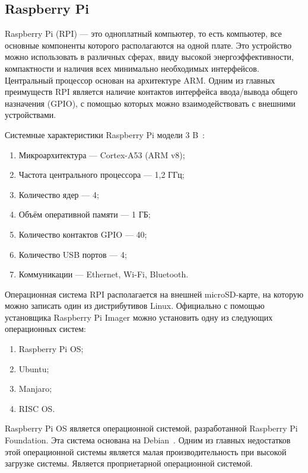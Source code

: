 \subsection{Raspberry Pi}

Raspberry Pi (RPI) --- это одноплатный компьютер, то есть компьютер, все основные компоненты которого располагаются на одной плате. Это устройство можно использовать в различных сферах, ввиду высокой энергоэффективности, компактности и наличия всех минимально необходимых интерфейсов. Центральный процессор основан на архитектуре ARM. Одним из главных преимуществ RPI является наличие контактов интерфейса ввода/вывода общего назначения (GPIO), с помощью которых можно взаимодействовать с внешними устройствами.

Системные характеристики Raspberry Pi модели 3 B~\cite{rpi-site}:

\begin{enumerate}
  \item Микроархитектура --- Cortex-A53 (ARM v8);
  \item Частота центрального процессора --- 1,2 ГГц;
  \item Количество ядер --- 4;
  \item Объём оперативной памяти --- 1 ГБ;
  \item Количество контактов GPIO --- 40;
  \item Количество USB портов --- 4;
  \item Коммуникации --- Ethernet, Wi-Fi, Bluetooth.
\end{enumerate}

Операционная система RPI располагается на внешней microSD-карте, на которую можно записать один из дистрибутивов Linux. Официально с помощью установщика Raspberry Pi Imager можно установить одну из следующих операционных систем:

\begin{enumerate}
  \item Raspberry Pi OS;
  \item Ubuntu;
  \item Manjaro;
  \item RISC OS.
\end{enumerate}

Raspberry Pi OS является операционной системой, разработанной Raspberry Pi Foundation. Эта система основана на Debian~\cite{rpi-site}. Одним из главных недостатков этой операционной системы является малая производительность при высокой загрузке системы. Является проприетарной операционной системой.

